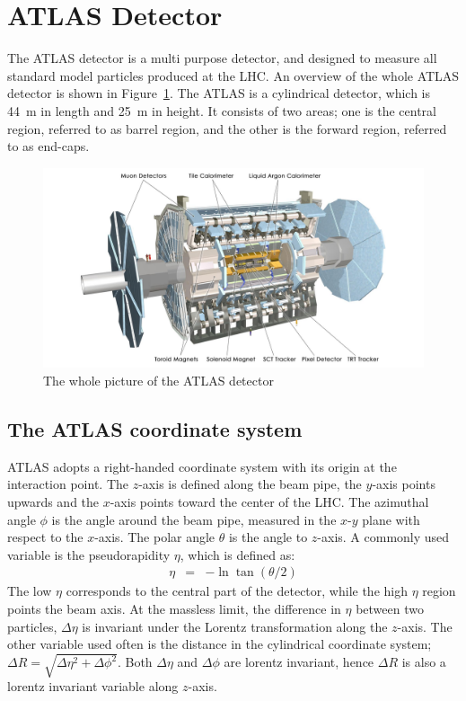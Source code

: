 \section{ATLAS Detector}
\label{sec:detector}
The ATLAS detector is a multi purpose detector, and designed to measure all standard model particles produced at the LHC.
An overview of the whole ATLAS detector is shown in Figure~\ref{fig:ATLAS}.
The ATLAS is a cylindrical detector, which is 44~m in length and 25~m in height. It consists of two areas; one is the central region, referred to as barrel region, and the other is the forward region, referred to as end-caps.
\begin{figure}[tbp]
\begin{center}
 \includegraphics[width=1.0\textwidth,keepaspectratio]{figures/detector/ATLAS}
\caption{
The whole picture of the ATLAS detector
}
\label{fig:ATLAS}
\end{center}
\end{figure}

\subsection{The ATLAS coordinate system}
ATLAS adopts a right-handed coordinate system with its origin at the interaction point. The $z$-axis is defined along the beam pipe, the $y$-axis points upwards and the $x$-axis points toward the center of the LHC. The azimuthal angle $\phi$ is the angle around the beam pipe, measured in the $x$-$y$ plane with respect to the $x$-axis. The polar angle $\theta$ is the angle to $z$-axis. A commonly used variable is the pseudorapidity $\eta$, which is defined as:
\begin{eqnarray*}
\eta &=& -\ln\tan(\theta/2)
\end{eqnarray*}
The low $\eta$ corresponds to the central part of the detector, while the high $\eta$ region points the beam axis. At the massless limit, the difference in $\eta$ between two particles, $\Delta\eta$ is invariant under the Lorentz transformation along the $z$-axis.
The other variable used often is the distance in the cylindrical coordinate system;
$
\Delta R = \sqrt{\Delta \eta^2 + \Delta \phi^2}
$.
Both $\Delta \eta$ and $\Delta \phi$ are lorentz invariant, hence $\Delta R$ is also a lorentz invariant variable along $z$-axis.

